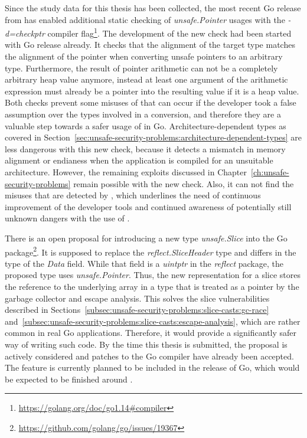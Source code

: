 Since the study data for this thesis has been collected, the most recent Go release  from
 has enabled additional static checking of \textit{unsafe.Pointer} usages with the
\textit{-d=checkptr} compiler flag\footnote{\url{https://golang.org/doc/go1.14\#compiler}}.
The development of the new check had been started with Go release  already.
It checks that the alignment of the target type matches the alignment of the pointer when converting unsafe pointers to
an arbitrary type.
Furthermore, the result of pointer arithmetic can not be a completely arbitrary heap value anymore, instead at least one
argument of the arithmetic expression must already be a pointer into the resulting value if it is a heap value.
Both checks prevent some misuses of \unsafe{} that can occur if the developer took a false assumption over the types
involved in a conversion, and therefore they are a valuable step towards a safer usage of \unsafe{} in Go.
Architecture-dependent types as covered in Section~\ref{sec:unsafe-security-problems:architecture-dependent-types} are
less dangerous with this new check, because it detects a mismatch in memory alignment or endianess when the application
is compiled for an unsuitable architecture.
However, the remaining exploits discussed in Chapter~\ref{ch:unsafe-security-problems} remain possible with the new
check.
Also, it can not find the misuses that are detected by \toolSafer{}, which underlines the need of continuous improvement
of the developer tools and continued awareness of potentially still unknown dangers with the use of \unsafe{}.

There is an open proposal for introducing a new type \textit{unsafe.Slice} into the Go \unsafe{}
package\footnote{\url{https://github.com/golang/go/issues/19367}}.
It is supposed to replace the \textit{reflect.SliceHeader} type and differs in the type of the \textit{Data} field.
While that field is a \textit{uintptr} in the \textit{reflect} package, the proposed type uses \textit{unsafe.Pointer}.
Thus, the new representation for a slice stores the reference to the underlying array in a type that is treated as a
pointer by the garbage collector and escape analysis.
This solves the slice vulnerabilities described in Sections~\ref{subsec:unsafe-security-problems:slice-casts:gc-race}
and~\ref{subsec:unsafe-security-problems:slice-casts:escape-analysis}, which are rather common in real Go applications.
Therefore, it would provide a significantly safer way of writing such code.
By the time this thesis is submitted, the proposal is actively considered and patches to the Go compiler have already
been accepted.
The feature is currently planned to be included in the  release of Go, which would be expected to be
finished around .

